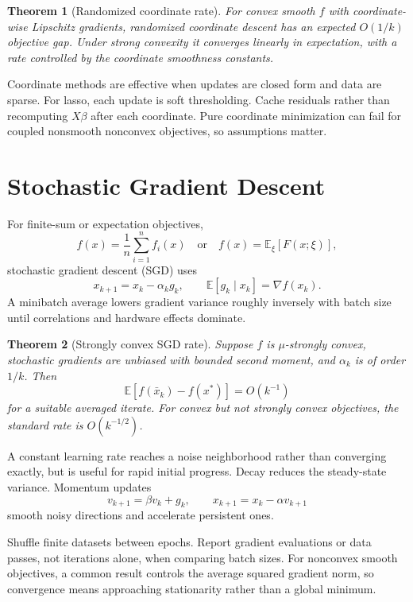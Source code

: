 \documentclass[12pt,oneside]{book}
\numberwithin{equation}{section}
\theoremstyle{definition}
\theoremstyle{plain}
\newtheorem{theorem}{Theorem}[section]
\theoremstyle{remark}
\newcommand{\E}{\mathbb{E}}
\newcommand{\grad}{\nabla}
\begin{document}
\begin{theorem}[Randomized coordinate rate]
For convex smooth $f$ with coordinate-wise Lipschitz gradients, randomized
coordinate descent has an expected $O(1/k)$ objective gap. Under strong
convexity it converges linearly in expectation, with a rate controlled by the
coordinate smoothness constants.
\end{theorem}

Coordinate methods are effective when updates are closed form and data are
sparse. For lasso, each update is soft thresholding. Cache residuals rather
than recomputing $X\beta$ after each coordinate. Pure coordinate minimization
can fail for coupled nonsmooth nonconvex objectives, so assumptions matter.

\section{Stochastic Gradient Descent}

For finite-sum or expectation objectives,
\[
 f(x)=\frac1n\sum_{i=1}^nf_i(x)
 \quad\text{or}\quad
 f(x)=\E_\xi[F(x;\xi)],
\]
stochastic gradient descent (SGD) uses
\begin{equation}
    x_{k+1}=x_k-\alpha_kg_k,\qquad
    \E[g_k\mid x_k]=\grad f(x_k).
    \label{eq:sgd}
\end{equation}
A minibatch average lowers gradient variance roughly inversely with batch
size until correlations and hardware effects dominate.

\begin{theorem}[Strongly convex SGD rate]
Suppose $f$ is $\mu$-strongly convex, stochastic gradients are unbiased with
bounded second moment, and $\alpha_k$ is of order $1/k$. Then
\[
    \E[f(\bar x_k)-f(x^*)]=O(k^{-1})
\]
for a suitable averaged iterate. For convex but not strongly convex objectives,
the standard rate is $O(k^{-1/2})$.
\end{theorem}

A constant learning rate reaches a noise neighborhood rather than converging
exactly, but is useful for rapid initial progress. Decay reduces the
steady-state variance. Momentum updates
\[
    v_{k+1}=\beta v_k+g_k,\qquad x_{k+1}=x_k-\alpha v_{k+1}
\]
smooth noisy directions and accelerate persistent ones.

Shuffle finite datasets between epochs. Report gradient evaluations or data
passes, not iterations alone, when comparing batch sizes. For nonconvex
smooth objectives, a common result controls the average squared gradient norm,
so convergence means approaching stationarity rather than a global minimum.
\end{document}

